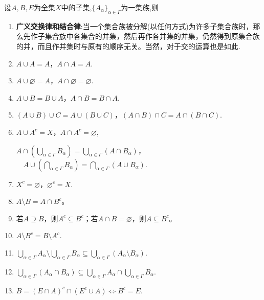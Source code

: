 \documentclass[../../main.tex]{subfiles}%
\begin{document}
\begin{theorem}[集合的运算及性质]\label{theorem:集合论-集合的运算及性质}
设$A,B,E$为全集$X$中的子集,$\{A_\alpha\}_{\alpha\in \Gamma}$为一集族,则
\begin{enumerate}[(1)]
\item \textbf{广义交换律和结合律}:当一个集合族被分解(以任何方式)为许多子集合族时，那么先作子集合族中各集合的并集，然后再作各并集的并集，仍然得到原集合族的并，而且作并集时与原有的顺序无关。当然，对于交的运算也是如此.

\item \(A \cup A = A\)，\(A \cap A = A\).

\item \(A \cup \varnothing = A\)，\(A \cap \varnothing = \varnothing\).

\item \(A \cup B = B \cup A\)，\(A \cap B = B \cap A\).

\item \((A \cup B) \cup C = A \cup (B \cup C)\)，\((A \cap B) \cap C = A \cap (B \cap C)\).

\item\label{theorem:集合论-集合的运算及性质-5} \( A \cup A^c = X\)，\(A \cap A^c = \varnothing\),

\(A \cap (\bigcup_{\alpha \in \varGamma} B_{\alpha}) = \bigcup_{\alpha \in \varGamma}(A \cap B_{\alpha})\)，\(\quad A \cup (\bigcap_{\alpha \in \varGamma} B_{\alpha}) = \bigcap_{\alpha \in \varGamma}(A \cup B_{\alpha})\).

\item \(X^c = \varnothing\)，\(\varnothing^c = X\).

\item \(A \setminus B = A \cap B^c\)。

\item 若\(A\supseteq B\)，则\(A^c\subseteq B^c\)；若\(A\cap B = \varnothing\)，则\(A\subseteq B^c\)。

\item\label{theorem:集合论-集合的运算及性质-11} $A\setminus B^c=B\setminus A^c$.

\item\label{theorem:集合论-集合的运算及性质-12} \(\bigcup_{\alpha \in \Gamma} A_{\alpha} \setminus \bigcup_{\alpha \in \Gamma} B_{\alpha} \subseteq \bigcup_{\alpha \in \Gamma} (A_{\alpha} \setminus B_{\alpha}).\)

\item\label{theorem:集合论-集合的运算及性质-13} $\bigcup_{\alpha \in \Gamma}{\left( A_{\alpha}\cap B_{\alpha} \right)}\subseteq \bigcup_{\alpha \in \Gamma}{A_{\alpha}}\cap \bigcup_{\alpha \in \Gamma}{B_{\alpha}}.$

\item $B = (E \cap A)^c \cap (E^c \cup A) \Leftrightarrow B^c = E.$
\end{enumerate}
\end{theorem}
\end{document}
